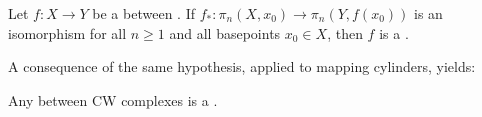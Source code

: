 \begin{theorem} \label{theorem:whitehead}
Let $f: X \to Y$ be a  between . If $f_*: \pi_n(X,x_0) \to \pi_n(Y,f(x_0))$ is an isomorphism for all $n \geq 1$ and all basepoints $x_0 \in X$, then $f$ is a .
\end{theorem}

A consequence of the same hypothesis, applied to mapping cylinders, yields:

\begin{corollary} \label{corollary:whitehead_weak_equivalence_of_cw_complexes_is_homotopy_equivalence}
Any  between CW complexes is a .
\end{corollary}
